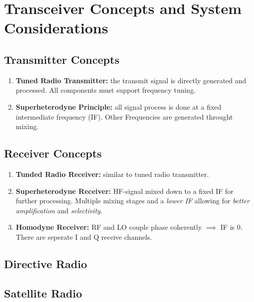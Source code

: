 \section{Transceiver Concepts and System Considerations}
\subsection{Transmitter Concepts}
\begin{enumerate}
    \itemsep0pt
    \item \textbf{Tuned Radio Transmitter:} the transmit signal is directly generated and processed. All components must support frequency tuning.
    \item \textbf{Superheterodyne Principle:} all signal process is done at a fixed intermediate frequency (IF). Other Frequencies are generated throught mixing.
\end{enumerate}
\subsection{Receiver Concepts}
\begin{enumerate}
    \itemsep0pt
    \item \textbf{Tunded Radio Receiver:} similar to tuned radio transmitter.
    \item \textbf{Superheterodyne Receiver:} HF-signal mixed down to a fixed IF for further processing. Multiple mixing stages and a \textit{lower IF} allowing for \textit{better amplification} and \textit{selectivity}.
    \item \textbf{Homodyne Receiver:} RF and LO couple phase coherently $\implies$ IF is 0. There are seperate I and Q receive channels.
\end{enumerate}
\subsection{Directive Radio}
\subsection{Satellite Radio}
